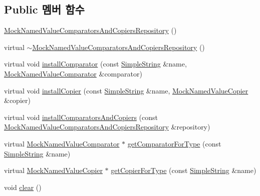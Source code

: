 \subsection*{Public 멤버 함수}
\begin{DoxyCompactItemize}
\item 
\hyperlink{class_mock_named_value_comparators_and_copiers_repository_ad778d94abaf474079e8adb857c9161ba}{Mock\+Named\+Value\+Comparators\+And\+Copiers\+Repository} ()
\item 
virtual \hyperlink{class_mock_named_value_comparators_and_copiers_repository_a26c3af7d96fbee925e581952393393b9}{$\sim$\+Mock\+Named\+Value\+Comparators\+And\+Copiers\+Repository} ()
\item 
virtual void \hyperlink{class_mock_named_value_comparators_and_copiers_repository_a6a92283ccd382316f4e3f84ed4c7fa1b}{install\+Comparator} (const \hyperlink{class_simple_string}{Simple\+String} \&name, \hyperlink{class_mock_named_value_comparator}{Mock\+Named\+Value\+Comparator} \&comparator)
\item 
virtual void \hyperlink{class_mock_named_value_comparators_and_copiers_repository_a558aef2ec4dc86ff685a8e3cf9e86441}{install\+Copier} (const \hyperlink{class_simple_string}{Simple\+String} \&name, \hyperlink{class_mock_named_value_copier}{Mock\+Named\+Value\+Copier} \&copier)
\item 
virtual void \hyperlink{class_mock_named_value_comparators_and_copiers_repository_a827874c390edb4be766153fe9e7ce6ab}{install\+Comparators\+And\+Copiers} (const \hyperlink{class_mock_named_value_comparators_and_copiers_repository}{Mock\+Named\+Value\+Comparators\+And\+Copiers\+Repository} \&repository)
\item 
virtual \hyperlink{class_mock_named_value_comparator}{Mock\+Named\+Value\+Comparator} $\ast$ \hyperlink{class_mock_named_value_comparators_and_copiers_repository_a8664d35dd3af8052c86639c2b56e1030}{get\+Comparator\+For\+Type} (const \hyperlink{class_simple_string}{Simple\+String} \&name)
\item 
virtual \hyperlink{class_mock_named_value_copier}{Mock\+Named\+Value\+Copier} $\ast$ \hyperlink{class_mock_named_value_comparators_and_copiers_repository_a39b6e1f8952e28ad6d4779e40b4f0b0d}{get\+Copier\+For\+Type} (const \hyperlink{class_simple_string}{Simple\+String} \&name)
\item 
void \hyperlink{class_mock_named_value_comparators_and_copiers_repository_ac8bb3912a3ce86b15842e79d0b421204}{clear} ()
\end{DoxyCompactItemize}
